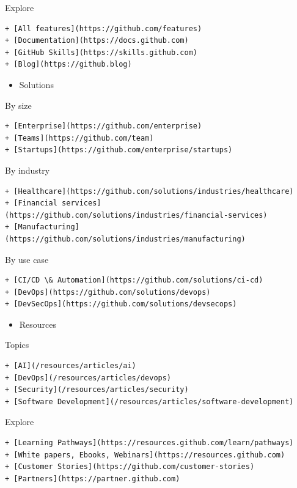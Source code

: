 \documentclass[
  letterpaper,
]{book}
\providecommand{\tightlist}{%
  \setlength{\itemsep}{0pt}\setlength{\parskip}{0pt}}\usepackage{longtable,booktabs,array}
\begin{document}
Explore

\begin{verbatim}
+ [All features](https://github.com/features)
+ [Documentation](https://docs.github.com)
+ [GitHub Skills](https://skills.github.com)
+ [Blog](https://github.blog)
\end{verbatim}

\begin{itemize}
\tightlist
\item
  Solutions
\end{itemize}

By size

\begin{verbatim}
+ [Enterprise](https://github.com/enterprise)
+ [Teams](https://github.com/team)
+ [Startups](https://github.com/enterprise/startups)
\end{verbatim}

By industry

\begin{verbatim}
+ [Healthcare](https://github.com/solutions/industries/healthcare)
+ [Financial services](https://github.com/solutions/industries/financial-services)
+ [Manufacturing](https://github.com/solutions/industries/manufacturing)
\end{verbatim}

By use case

\begin{verbatim}
+ [CI/CD \& Automation](https://github.com/solutions/ci-cd)
+ [DevOps](https://github.com/solutions/devops)
+ [DevSecOps](https://github.com/solutions/devsecops)
\end{verbatim}

\begin{itemize}
\tightlist
\item
  Resources
\end{itemize}

Topics

\begin{verbatim}
+ [AI](/resources/articles/ai)
+ [DevOps](/resources/articles/devops)
+ [Security](/resources/articles/security)
+ [Software Development](/resources/articles/software-development)
\end{verbatim}

Explore

\begin{verbatim}
+ [Learning Pathways](https://resources.github.com/learn/pathways)
+ [White papers, Ebooks, Webinars](https://resources.github.com)
+ [Customer Stories](https://github.com/customer-stories)
+ [Partners](https://partner.github.com)
\end{verbatim}
\end{document}
